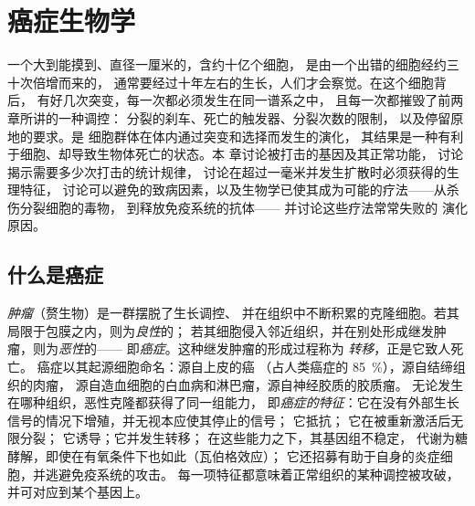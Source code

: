 \chapter{癌症生物学}\label{ch:b3:cancer-biology}

一个大到能摸到、直径一厘米的，含约十亿个细胞，
是由一个出错的细胞经约三十次倍增而来的，
通常要经过十年左右的生长，人们才会察觉。在这个细胞背后，
有好几次突变，每一次都必须发生在同一谱系之中，
且每一次都摧毁了前两章所讲的一种调控：
分裂的刹车、死亡的触发器、分裂次数的限制，
以及停留原地的要求。是
细胞群体在体内通过突变和选择而发生的演化，
其结果是一种有利于细胞、却导致生物体死亡的状态。本
章讨论被打击的基因及其正常功能，
讨论揭示需要多少次打击的统计规律，
讨论在超过一毫米并发生扩散时必须获得的生理特征，
讨论可以避免的致病因素，以及生物学已使其成为可能的疗法——从杀伤分裂细胞的毒物，
到释放免疫系统的抗体——
并讨论这些疗法常常失败的
演化原因。

\section{什么是癌症}

\begin{definition}[肿瘤、癌症、癌症的特征]\label{def:b3:cancer-biology:hallmarks}
\emph{肿瘤}（赘生物）是一群摆脱了生长调控、
并在组织中不断积累的克隆细胞。若其局限于包膜之内，则为\emph{良性}的；
若其细胞侵入邻近组织，并在别处形成继发肿瘤，则为\emph{恶性}的——
即\emph{癌症}。这种继发肿瘤的形成过程称为
\emph{转移}，正是它致人死亡。
癌症以其起源细胞命名：源自上皮的癌
（占人类癌症的 \qty{85}{\%}），源自结缔组织的肉瘤，
源自造血细胞的白血病和淋巴瘤，源自神经胶质的胶质瘤。
无论发生在哪种组织，恶性克隆都获得了同一组能力，
即\emph{癌症的特征}：它在没有外部生长信号的情况下增殖，并无视本应使其停止的信号；
它抵抗；
它在被重新激活后无限分裂；
它诱导；它并发生转移；
在这些能力之下，其基因组不稳定，
代谢为糖酵解，即使在有氧条件下也如此（瓦伯格效应）；
它还招募有助于自身的炎症细胞，并逃避免疫系统的攻击。
每一项特征都意味着正常组织的某种调控被攻破，
并可对应到某个基因上。
\end{definition}

